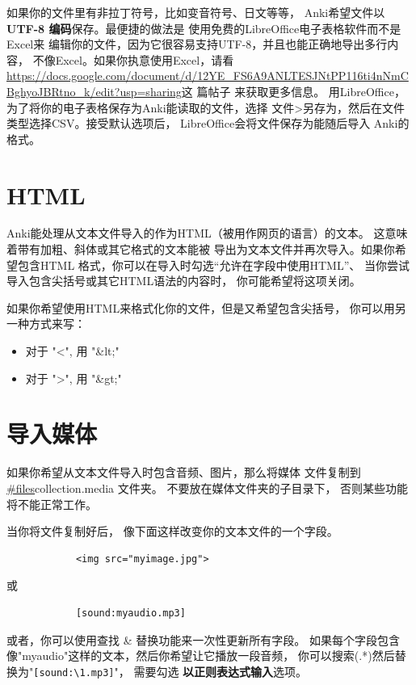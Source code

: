 \documentclass[a4paper]{book}
\newcounter{img}[chapter]
\begin{document}
		如果你的文件里有非拉丁符号，比如变音符号、日文等等， Anki希望文件以
		\textbf{UTF-8 编码}保存。最便捷的做法是 使用免费的LibreOffice电子表格软件而不是Excel来 编辑你的文件，因为它很容易支持UTF-8，并且也能正确地导出多行内容， 不像Excel。如果你执意使用Excel，请看
		\url{https://docs.google.com/document/d/12YE_FS6A9ANLTESJNtPP116ti4nNmCBghyoJBRtno_k/edit?usp=sharing}这
		篇帖子 来获取更多信息。
		用LibreOffice，为了将你的电子表格保存为Anki能读取的文件，选择 文件>另存为，然后在文件类型选择CSV。接受默认选项后， LibreOffice会将文件保存为能随后导入 Anki的格式。
		
		\section{HTML}
		Anki能处理从文本文件导入的作为HTML（被用作网页的语言）的文本。 这意味着带有加粗、斜体或其它格式的文本能被 导出为文本文件并再次导入。如果你希望包含HTML 格式，你可以在导入时勾选“允许在字段中使用HTML”、 当你尝试导入包含尖括号或其它HTML语法的内容时， 你可能希望将这项关闭。
		
		如果你希望使用HTML来格式化你的文件，但是又希望包含尖括号， 你可以用另一种方式来写：
		
		\begin{itemize}
			\itemsep1pt\parskip0pt
			\item 对于 "<", 用 "\&lt;"
			\item 对于 ">", 用 "\&gt;"
		\end{itemize}
		\section{导入媒体}
		如果你希望从文本文件导入时包含音频、图片，那么将媒体 文件复制到 \url{#files}collection.media 文件夹。 不要放在媒体文件夹的子目录下，
		否则某些功能将不能正常工作。 
		
		当你将文件复制好后， 像下面这样改变你的文本文件的一个字段。
		
		\begin{shaded}\begin{verbatim}
			<img src="myimage.jpg">
			\end{verbatim}\end{shaded}
		或
		\begin{shaded}\begin{verbatim}
			[sound:myaudio.mp3]
			\end{verbatim}\end{shaded}
		
		或者，你可以使用查找 \& 替换功能来一次性更新所有字段。 如果每个字段包含像"myaudio"这样的文本，然后你希望让它播放一段音频， 你可以搜索(.*)然后替换为"\verb|[sound:\1.mp3]|"， 需要勾选 \textbf{以正则表达式输入}选项。
		
\end{document}
